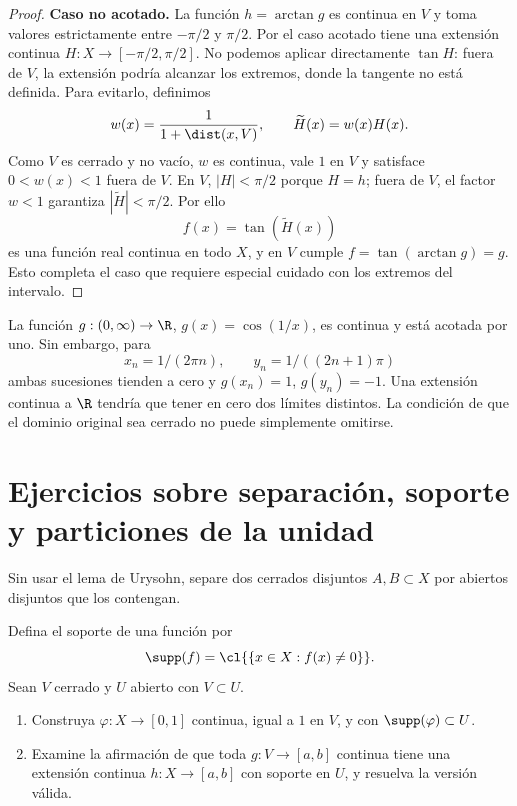 \begin{proof}
\textbf{Caso no acotado.} La función $h=\arctan g$ es continua en $V$ y toma valores estrictamente entre $-\pi/2$ y $\pi/2$. Por el caso acotado tiene una extensión continua $H:X\to[-\pi/2,\pi/2]$. No podemos aplicar directamente $\tan H$: fuera de $V$, la extensión podría alcanzar los extremos, donde la tangente no está definida. Para evitarlo, definimos
\[
 w(x)=\frac1{1+\dist(x,V)},\qquad \widetilde H(x)=w(x)H(x).
\]
Como $V$ es cerrado y no vacío, $w$ es continua, vale $1$ en $V$ y satisface $0<w(x)<1$ fuera de $V$. En $V$, $|H|<\pi/2$ porque $H=h$; fuera de $V$, el factor $w<1$ garantiza $|\widetilde H|<\pi/2$. Por ello
\[
 f(x)=\tan(\widetilde H(x))
\]
es una función real continua en todo $X$, y en $V$ cumple $f=\tan(\arctan g)=g$. Esto completa el caso que requiere especial cuidado con los extremos del intervalo.
\end{proof}

\begin{ejemplo}
La función $g:(0,\infty)\to\R$, $g(x)=\cos(1/x)$, es continua y está acotada por uno. Sin embargo, para
\[
 x_n=1/(2\pi n),\qquad y_n=1/((2n+1)\pi)
\]
ambas sucesiones tienden a cero y $g(x_n)=1$, $g(y_n)=-1$. Una extensión continua a $\R$ tendría que tener en cero dos límites distintos. La condición de que el dominio original sea cerrado no puede simplemente omitirse.
\end{ejemplo}

\section{Ejercicios sobre separación, soporte y particiones de la unidad}
\begin{ejercicio}\label{ej:lectura-12-1}
Sin usar el lema de Urysohn, separe dos cerrados disjuntos $A,B\subset X$ por abiertos disjuntos que los contengan.
\end{ejercicio}


\begin{ejercicio}\label{ej:lectura-12-2}\label{ch12:soporte}
Defina el soporte de una función por
\[
 \supp(f)=\cl{\{x\in X:f(x)\ne0\}}.
\]
Sean $V$ cerrado y $U$ abierto con $V\subset U$.
\begin{enumerate}[label=(\roman*)]
\item Construya $\varphi:X\to[0,1]$ continua, igual a $1$ en $V$, y con $\supp(\varphi)\subset U$.
\item Examine la afirmación de que toda $g:V\to[a,b]$ continua tiene una extensión continua $h:X\to[a,b]$ con soporte en $U$, y resuelva la versión válida.
\end{enumerate}
\end{ejercicio}


